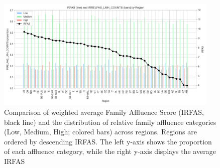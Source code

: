 \begin{figure}[H]
    \centering
    \includegraphics[width=0.95\textwidth]{Report/final_report/pictures/IRFASvsIRRELFAS.png}
    \caption{Comparison of weighted average Family Affluence Score (IRFAS, black line) and the distribution of relative family affluence categories (Low, Medium, High; colored bars) across regions. Regions are ordered by descending IRFAS. The left y-axis shows the proportion of each affluence category, while the right y-axis displays the average IRFAS}
    \label{fig:IRFASvsIRRELFAS}
\end{figure}
